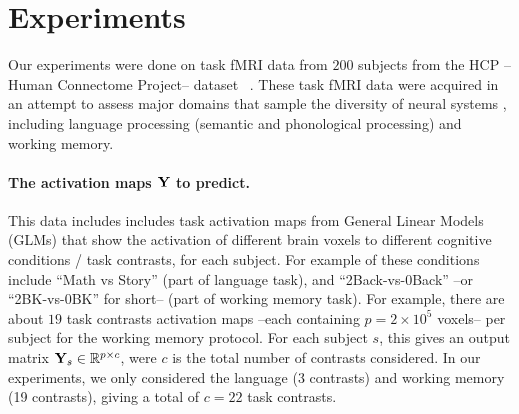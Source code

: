 
\section{Experiments}
\label{sec:exp}
Our experiments were done on task fMRI data from
$200$ subjects from the HCP --Human Connectome Project-- dataset
 ~\citep{VanEssen20122222}. These task fMRI data were acquired in an
 attempt to assess major
 domains that sample the diversity of neural systems , including
 language processing (semantic and phonological
processing) and working memory.
\paragraph{The activation maps $\mathbf{Y}$ to predict.}
This data includes includes task activation
maps from General Linear Models (GLMs)  \citep{friston1994statistical} that show the activation
of different brain voxels to different cognitive conditions / task contrasts, for each subject.
For example of these conditions include ``Math vs Story'' (part of language task),
and ``2Back-vs-0Back'' --or ``2BK-vs-0BK'' for short-- (part of working memory task).
For example, there are about $19$ task contrasts activation maps
--each containing $p = 2 \times 10^5$ voxels-- per subject for the
working memory protocol. For each subject $s$, this gives an output matrix
$\mathbf{Y}_s \in \mathbb R^{p \times c}$, were $c$ is the total number of contrasts considered.
In our experiments, we only considered the language (3 contrasts) and working memory
(19 contrasts), giving a total of $c=22$ task contrasts.\\

